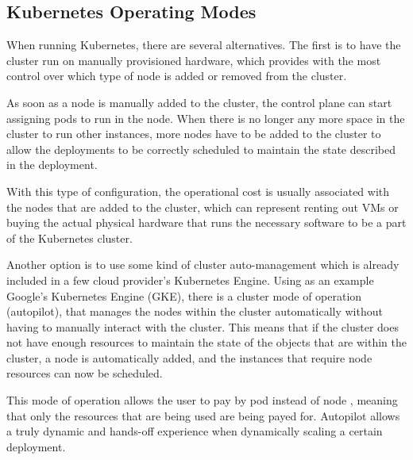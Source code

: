 \subsection{Kubernetes Operating Modes}

When running Kubernetes, there are several alternatives. The first is to have
the cluster run on manually provisioned hardware, which provides with the most
control over which type of node is added or removed from the cluster. 

As soon as a node is manually added to the cluster, the control plane can start
assigning pods to run in the node. When there is no longer any more space in the
cluster to run other instances, more nodes have to be added to the cluster to
allow the deployments to be correctly scheduled to maintain the state described
in the deployment.

With this type of configuration, the operational cost is usually associated with
the nodes that are added to the cluster, which can represent renting out VMs or
buying the actual physical hardware that runs the necessary software to be a part
of the Kubernetes cluster.

Another option is to use some kind of cluster auto-management which is
already included in a few cloud provider's Kubernetes Engine. Using as an
example Google's Kubernetes Engine (GKE), there is a cluster mode of operation
(autopilot), that manages the nodes within the cluster automatically
without having to manually interact with the cluster. This means that if the
cluster does not have enough resources to maintain the state of the objects that
are within the cluster, a node is automatically added, and the
instances that require node resources can now be scheduled.

This mode of operation allows the user to pay by pod instead of node
\cite{GKEautopilot}, meaning that only the resources that are being used are
being payed for. Autopilot allows a truly dynamic and hands-off experience when
dynamically scaling a certain deployment.
